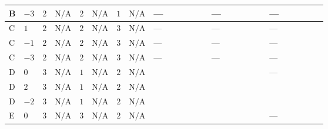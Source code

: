 \documentclass[8pt]{article}
\begin{document}
\begin{landscape}
\begin{longtable}{@{}llcccccc >{\raggedright\arraybackslash}p{0.21\linewidth} >{\raggedright\arraybackslash}p{0.21\linewidth} >{\raggedright\arraybackslash}p{0.21\linewidth}@{}}
\midrule
B & $-3$ & $2$ & $\text{N/A}$ & $2$ & $\text{N/A}$ & $1$ & $\text{N/A}$ & --- & --- & --- \\
\midrule
C & $1$ & $2$ & $\text{N/A}$ & $2$ & $\text{N/A}$ & $3$ & $\text{N/A}$ & --- & --- & --- \\
\midrule
C & $-1$ & $2$ & $\text{N/A}$ & $2$ & $\text{N/A}$ & $3$ & $\text{N/A}$ & --- & --- & --- \\
\midrule
C & $-3$ & $2$ & $\text{N/A}$ & $2$ & $\text{N/A}$ & $3$ & $\text{N/A}$ & --- & --- & --- \\
\midrule
D & $0$ & $3$ & $\text{N/A}$ & $1$ & $\text{N/A}$ & $2$ & $\text{N/A}$ & \scriptsize\adjustbox{max width=\linewidth}{$\begin{gathered} +8 {\lambda_{S_1}^{(1)}} {\lambda_{S_1}^{(A)}}\end{gathered}$} & \scriptsize\adjustbox{max width=\linewidth}{$\begin{gathered} +16 {\lambda_{S_1}^{(A)}}^2\end{gathered}$} & --- \\
\midrule
D & $2$ & $3$ & $\text{N/A}$ & $1$ & $\text{N/A}$ & $2$ & $\text{N/A}$ & \scriptsize\adjustbox{max width=\linewidth}{$\begin{gathered} +8 {\lambda_{S_1}^{(1)}} {\lambda_{S_1}^{(A)}}\end{gathered}$} & \scriptsize\adjustbox{max width=\linewidth}{$\begin{gathered} +16 {\lambda_{S_1}^{(A)}}^2\end{gathered}$} & \scriptsize\adjustbox{max width=\linewidth}{$\begin{gathered} +{g_1}^2 \left(8 {g_2}^2-12 {\lambda_{S_1}^{(1)}}\right)\end{gathered}$} \\
\midrule
D & $-2$ & $3$ & $\text{N/A}$ & $1$ & $\text{N/A}$ & $2$ & $\text{N/A}$ & \scriptsize\adjustbox{max width=\linewidth}{$\begin{gathered} +8 {\lambda_{S_1}^{(1)}} {\lambda_{S_1}^{(A)}}\end{gathered}$} & \scriptsize\adjustbox{max width=\linewidth}{$\begin{gathered} +16 {\lambda_{S_1}^{(A)}}^2\end{gathered}$} & \scriptsize\adjustbox{max width=\linewidth}{$\begin{gathered} +{g_1}^2 \left(8 {g_2}^2-12 {\lambda_{S_1}^{(1)}}\right)\end{gathered}$} \\
\midrule
E & $0$ & $3$ & $\text{N/A}$ & $3$ & $\text{N/A}$ & $2$ & $\text{N/A}$ & \scriptsize\adjustbox{max width=\linewidth}{$\begin{gathered} +8 {\lambda_{S_1}^{(1)}} {\lambda_{S_1}^{(A)}}\end{gathered}$} & \scriptsize\adjustbox{max width=\linewidth}{$\begin{gathered} +16 {\lambda_{S_1}^{(A)}}^2\end{gathered}$} & --- \\

\end{longtable}
\end{landscape}
\end{document}
